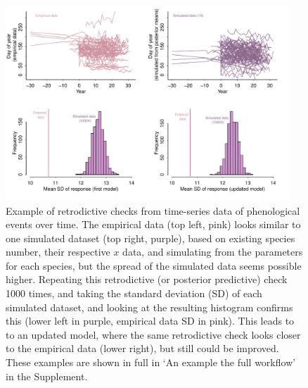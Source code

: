 \documentclass[11pt]{article}
\begin{document}
\begin{figure}[ht]
\centering
\noindent \includegraphics[width=0.95\textwidth]{examples/synchrony/graphs/fourpanelforpaper.pdf} %
\caption{Example of retrodictive checks from time-series data of phenological events over time. The empirical data (top left, pink) looks similar to one simulated dataset (top right, purple), based on existing species number, their respective $x$ data, and simulating from the parameters for each species, but the spread of the simulated data seems possible higher. Repeating this retrodictive (or posterior predictive) check 1000 times, and taking the standard deviation (SD) of each simulated dataset, and looking at the resulting histogram confirms this (lower left in purple, empirical data SD in pink). This leads to to an updated model, where the same retrodictive check looks closer to the empirical data (lower right), but still could be improved. These examples are shown in full in `An example the full workflow' in the Supplement.}
\label{fig:retrodictivecheck}
\end{figure}
\end{document}
